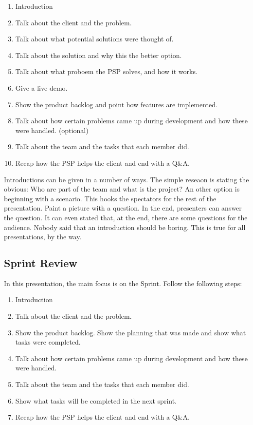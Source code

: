 \documentclass[10pt]{report}
\begin{document}
\begin{enumerate}
	\item Introduction
	\item Talk about the client and the problem.
	\item Talk about what potential solutions were thought of.
	\item Talk about the solution and why this the better option.
	\item Talk about what proboem the PSP solves, and how it works.
	\item Give a live demo.
	\item Show the product backlog and point how features are implemented.
	\item Talk about how certain problems came up during development and how these were handled. (optional)
	\item Talk about the team and the tasks that each member did.
	\item Recap how the PSP helps the client and end with a Q\&A.
\end{enumerate}

Introductions can be given in a number of ways. The simple reseaon is stating the obvious: Who are part of the team and what is the project? An other option is beginning with a scenario. This hooks the spectators for the rest of the presentation. Paint a picture with a question. In the end, presenters can answer the question. It can even stated that, at the end, there are some questions for the audience. Nobody said that an introduction should be boring. This is true for all presentations, by the way.

\subsection{Sprint Review}

In this presentation, the main focus is on the Sprint. Follow the following steps:

\begin{enumerate}
	\item Introduction
	\item Talk about the client and the problem.
	\item Show the product backlog. Show the planning that was made and show what tasks were completed.
	\item Talk about how certain problems came up during development and how these were handled.
	\item Talk about the team and the tasks that each member did.
	\item Show what tasks will be completed in the next sprint.
	\item Recap how the PSP helps the client and end with a Q\&A.
\end{enumerate}
\end{document}
